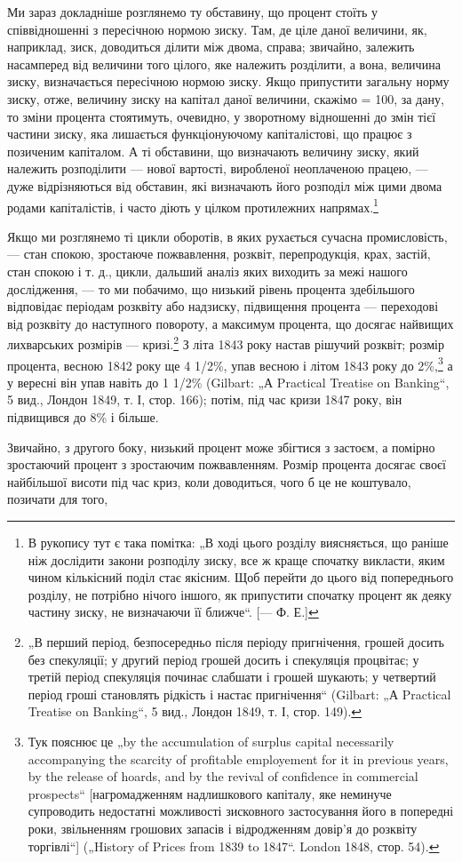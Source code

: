 Ми зараз докладніше розглянемо ту обставину, що процент
стоїть у співвідношенні з пересічною нормою зиску. Там, де
ціле даної величини, як, наприклад, зиск, доводиться ділити між
двома, справа; звичайно, залежить насамперед від величини того
цілого, яке належить розділити, а вона, величина зиску, визначається
пересічною нормою зиску. Якщо припустити загальну
норму зиску, отже, величину зиску на капітал даної величини,
скажімо = 100, за дану, то зміни процента стоятимуть, очевидно,
у зворотному відношенні до змін тієї частини зиску, яка лишається
функціонуючому капіталістові, що працює з позиченим
капіталом. А ті обставини, що визначають величину зиску, який
належить розподілити — нової вартості, виробленої неоплаченою
працею, — дуже відрізняються від обставин, які визначають його
розподіл між цими двома родами капіталістів, і часто діють у цілком
протилежних напрямах.\footnote{
В рукопису тут є така помітка: „В ході цього розділу виясняється, що
раніше ніж дослідити закони розподілу зиску, все ж краще спочатку викласти,
яким чином кількісний поділ стає якісним. Щоб перейти до цього від попереднього
розділу, не потрібно нічого іншого, як припустити спочатку процент як
деяку частину зиску, не визначаючи її ближче“. [— Ф. Е.]
}

Якщо ми розглянемо ті цикли оборотів, в яких рухається сучасна
промисловість, — стан спокою, зростаюче пожвавлення, розквіт,
перепродукція, крах, застій, стан спокою і т. д., цикли,
дальший аналіз яких виходить за межі нашого дослідження, —
то ми побачимо, що низький рівень процента здебільшого відповідає
періодам розквіту або надзиску, підвищення процента —
переходові від розквіту до наступного повороту, а максимум
процента, що досягає найвищих лихварських розмірів — кризі.\footnote{
„В перший період, безпосередньо після періоду пригнічення, грошей
досить без спекуляції; у другий період грошей досить і спекуляція процвітає;
у третій період спекуляція починає слабшати і грошей шукають; у четвертий
період гроші становлять рідкість і настає пригнічення“ (Gilbart: „А Practical
Treatise on Banking“, 5 вид., Лондон 1849, т. І, стор. 149).
}
З літа 1843 року настав рішучий розквіт; розмір процента, весною
1842 року ще 4 1/2\%, упав весною і літом 1843 року до 2\%,\footnote{
Тук пояснює це „by the accumulation of surplus capital necessarily accompanying
the scarcity of profitable employement for it in previous years, by the release
of hoards, and by the revival of confidence in commercial prospects“ [нагромадженням
надлишкового капіталу, яке неминуче супроводить недостатні
можливості зисковного застосування його в попередні роки, звільненням грошових
запасів і відродженням довір’я до розквіту торгівлі“] („History of
Prices from 1839 to 1847“. London 1848, стор. 54).
}
а у вересні він упав навіть до 1 1/2\% (Gilbart: „А Practical Treatise
on Banking“, 5 вид., Лондон 1849, т. І, стор. 166); потім, під час
кризи 1847 року, він підвищився до 8\% і більше.

Звичайно, з другого боку, низький процент може збігтися з
застоєм, а помірно зростаючий процент з зростаючим пожвавленням.
Розмір процента досягає своєї найбільшої висоти під час криз,
коли доводиться, чого б це не коштувало, позичати для того,